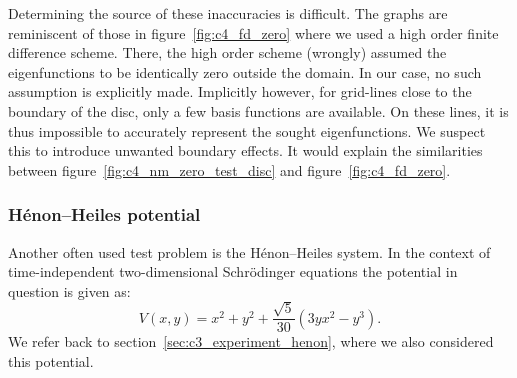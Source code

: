 Determining the source of these inaccuracies is difficult. The graphs are reminiscent of those in figure~\ref{fig:c4_fd_zero} where we used a high order finite difference scheme. There, the high order scheme (wrongly) assumed the eigenfunctions to be identically zero outside the domain. In our case, no such assumption is explicitly made. Implicitly however, for grid-lines close to the boundary of the disc, only a few basis functions are available. On these lines, it is thus impossible to accurately represent the sought eigenfunctions. We suspect this to introduce unwanted boundary effects. It would explain the similarities between figure~\ref{fig:c4_nm_zero_test_disc} and figure~\ref{fig:c4_fd_zero}.


\subsubsection{H\texorpdfstring{é}{e}non--Heiles potential}\label{sec:c4_numerical_henon_heiles}

Another often used test problem is the Hénon--Heiles system. In the context of time-independent two-dimensional Schrödinger equations the potential in question is given as:
\begin{equation}\label{equ:c4_henon_heiles_potential}
    V(x, y) = x^2 + y^2 + \frac{\sqrt{5}}{30}(3 y x^2 - y^3)\text{.}
\end{equation}
We refer back to section~\ref{sec:c3_experiment_henon}, where we also considered this potential.


